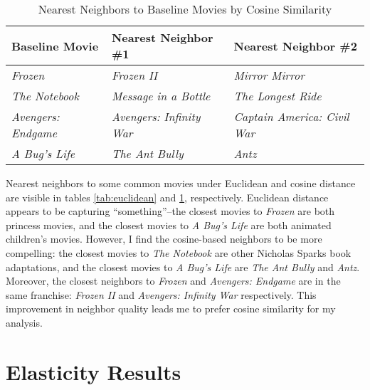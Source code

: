 \documentclass{article}
\begin{document}
\begin{table}[]
    \begin{center}
        \begin{tabular}{@{}lll@{}}
        \toprule
        \textbf{Baseline Movie}    & \textbf{Nearest Neighbor \#1}   & \textbf{Nearest Neighbor \#2}       \\ \midrule
        \textit{Frozen}            & \textit{Frozen II}              & \textit{Mirror Mirror}              \\
        \textit{The Notebook}      & \textit{Message in a Bottle}    & \textit{The Longest Ride}           \\
        \textit{Avengers: Endgame} & \textit{Avengers: Infinity War} & \textit{Captain America: Civil War} \\
        \textit{A Bug's Life}      & \textit{The Ant Bully}          & \textit{Antz}                       \\ \bottomrule
        \end{tabular}
        \caption{Nearest Neighbors to Baseline Movies by Cosine Similarity}
        \label{tab:cosine}
    \end{center}
\end{table}

Nearest neighbors to some common movies under Euclidean and cosine distance are visible in tables \ref{tab:euclidean} and \ref{tab:cosine}, respectively. Euclidean distance appears to be capturing ``something''--the closest movies to \emph{Frozen} are both princess movies, and the closest movies to \emph{A Bug's Life} are both animated children's movies. However, I find the cosine-based neighbors to be more compelling: the closest movies to \emph{The Notebook} are other Nicholas Sparks book adaptations, and the closest movies to \emph{A Bug's Life} are \emph{The Ant Bully} and \emph{Antz}. Moreover, the closest neighbors to \emph{Frozen} and \emph{Avengers: Endgame} are in the same franchise: \emph{Frozen II} and \emph{Avengers: Infinity War} respectively. This improvement in neighbor quality leads me to prefer cosine similarity for my analysis.

\section{Elasticity Results}
\end{document}

